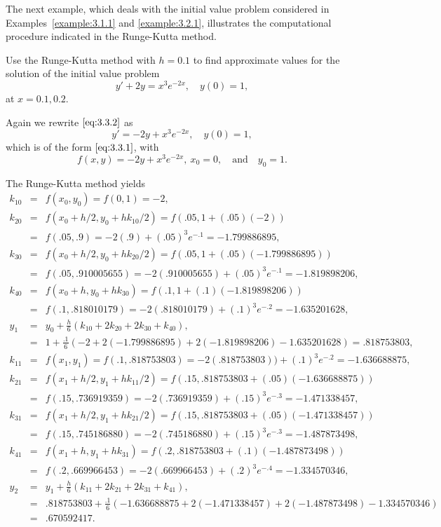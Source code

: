 \documentclass{ximera}
\begin{document}
 The next example, which deals with the initial value problem
considered in Examples~\ref{example:3.1.1} and \ref{example:3.2.1},
illustrates
the computational procedure indicated in the Runge-Kutta method.

\begin{example}\label{example:3.3.1}
Use the Runge-Kutta method with $h=0.1$ to find approximate values for
the solution of the initial value problem
\begin{equation}\label{eq:3.3.2}
y'+2y=x^3e^{-2x},\quad y(0)=1,
\end{equation}
at $x=0.1,0.2$.


\begin{explanation}
Again we rewrite $\eqref{eq:3.3.2}$  as
$$
y'=-2y+x^3e^{-2x},\quad y(0)=1,
$$
which is of the form $\eqref{eq:3.3.1}$, with
$$
f(x,y)=-2y+x^3e^{-2x},\ x_0=0,\quad\mbox{and}\quad y_0=1.
$$

The Runge-Kutta method yields
\begin{eqnarray*}
k_{10} & = & f(x_0,y_0)
  = f(0,1)=-2,\\
k_{20} & = & f(x_0+h/2,y_0+hk_{10}/2)=f(.05,1+(.05)(-2))\\
 &=& f(.05,.9)=-2(.9)+(.05)^3e^{-.1}=-1.799886895,\\
k_{30} & = & f(x_0+h/2,y_0+hk_{20}/2)=f(.05,1+(.05)(-1.799886895))\\
 &=& f(.05,.910005655)=-2(.910005655)+(.05)^3e^{-.1}=-1.819898206,\\
k_{40} & = & f(x_0+h,y_0+hk_{30})=f(.1,1+(.1)(-1.819898206))\\
&=&f(.1,.818010179)=-2(.818010179)+(.1)^3e^{-.2}=-1.635201628,\\
y_1&=&y_0+\frac{h}{6}(k_{10}+2k_{20}+2k_{30}+k_{40}),\\
&=&1+\frac{.1}{6}(-2+2(-1.799886895)+2(-1.819898206)
-1.635201628)=.818753803,\\
k_{11} & = & f(x_1,y_1)
  = f(.1,.818753803)=-2(.818753803))+(.1)^3e^{-.2}=-1.636688875,\\
k_{21} & = & f(x_1+h/2,y_1+hk_{11}/2)=f(.15,.818753803+(.05)(-1.636688875))\\
 &=& f(.15,.736919359)=-2(.736919359)+(.15)^3e^{-.3}=-1.471338457,\\
k_{31} & = & f(x_1+h/2,y_1+hk_{21}/2)=f(.15,.818753803+(.05)(-1.471338457))\\
 &=& f(.15,.745186880)=-2(.745186880)+(.15)^3e^{-.3}=-1.487873498,\\
k_{41} & = &
f(x_1+h,y_1+hk_{31})=f(.2,.818753803+(.1)(-1.487873498))\\
&=&f(.2,.669966453)=-2(.669966453)+(.2)^3e^{-.4}=-1.334570346,\\
y_2&=&y_1+\frac{h}{6}(k_{11}+2k_{21}+2k_{31}+k_{41}),\\
&=&.818753803+\frac{.1}{6}(-1.636688875+2(-1.471338457)+2(-1.487873498)-1.334570346)
\\&=&.670592417.
\end{eqnarray*}

\end{explanation}
\end{example}
\end{document}
